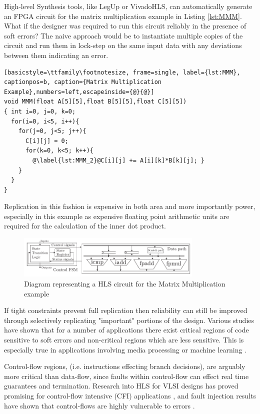 \providecommand*{\lstnumberautorefname}{line}

High-level Synthesis tools, like LegUp or VivadoHLS, can automatically generate an FPGA 
circuit for the matrix multiplication example in Listing \ref{lst:MMM}.
What if the designer was required to run this circuit reliably in the
presence of soft errors? 
The naive approach would be to instantiate multiple copies of the circuit and run
them in lock-step on the same input data with any deviations between them
indicating an error.

\lstset{language=C}
\begin{lstlisting}[basicstyle=\ttfamily\footnotesize, frame=single, label={lst:MMM}, captionpos=b, caption={Matrix Multiplication Example},numbers=left,escapeinside={@}{@}]
void MMM(float A[5][5],float B[5][5],float C[5][5])
{ int i=0, j=0, k=0;
  for(i=0, i<5, i++){
    for(j=0, j<5; j++){
      C[i][j] = 0;
      for(k=0, k<5; k++){
        @\label{lst:MMM_2}@C[i][j] += A[i][k]*B[k][j]; }
    }
  }
}
\end{lstlisting}

Replication in this fashion is expensive in both area and more importantly
power, especially in this example as expensive floating point arithmetic
units are required for the calculation of the inner dot product.

\begin{figure}[h]
\centering
\includegraphics[width=3.5in]{./imgs/singleHLSArch_v2.pdf}
\caption{Diagram representing a HLS circuit for the Matrix Multiplication example}
\label{fig:singleHLSArch}
\end{figure}

If tight constraints prevent full replication then reliability can still be
improved through selectively replicating "important" portions of the design.
Various studies have shown that for a number of applications there exist critical regions
of code sensitive to soft errors and non-critical regions which are less sensitive.
This is especially true in applications involving media processing or machine
learning\cite{wong2006soft} \cite{liu2012flikker}.

Control-flow regions, (i.e. instructions effecting branch decisions), are arguably more critical
than data-flow, since faults within control-flow can effect real time guarantees
and termination.
Research into HLS for VLSI designs has proved promising for control-flow intensive
(CFI) applications \cite{chen2014reliability,chen2015reliability}, and fault injection
results have shown that control-flows are highly vulnerable to errors
\cite{saggese2005microprocessor, nakka2007processor, wong2006soft}.

